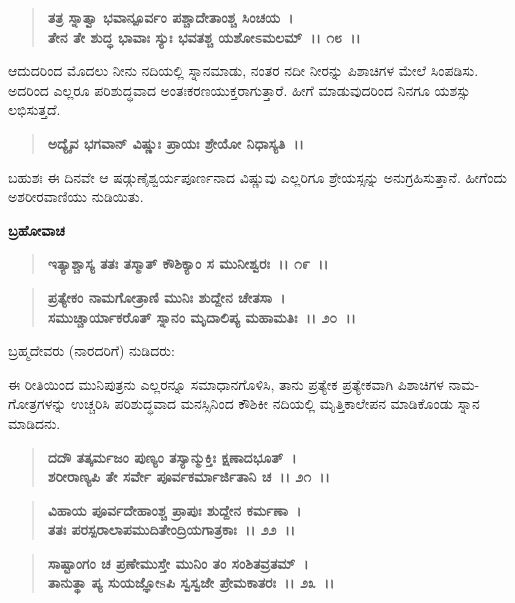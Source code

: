 \begin{verse}
\textbf{ತತ್ರ ಸ್ನಾತ್ವಾ ಭವಾನ್ಪೂರ್ವಂ ಪಶ್ಚಾದೇತಾಂಶ್ಚ ಸಿಂಚಯ~।}\\\textbf{ತೇನ ತೇ ಶುದ್ಧ ಭಾವಾಃ ಸ್ಯುಃ ಭವತಶ್ಚ ಯಶೋಽಮಲಮ್~।। ೧೮~।।}
\end{verse}

ಆದುದರಿಂದ ಮೊದಲು ನೀನು ನದಿಯಲ್ಲಿ ಸ್ನಾನಮಾಡು, ನಂತರ ನದೀ ನೀರನ್ನು ಪಿಶಾಚಿಗಳ ಮೇಲೆ ಸಿಂಪಡಿಸು. ಅದರಿಂದ ಎಲ್ಲರೂ ಪರಿಶುದ್ಧವಾದ ಅಂತಃಕರಣಯುಕ್ತ\-ರಾಗುತ್ತಾರೆ. ಹೀಗೆ ಮಾಡುವುದರಿಂದ ನಿನಗೂ ಯಶಸ್ಸು ಲಭಿಸುತ್ತದೆ.

\begin{verse}
\textbf{ಅದ್ಯೈವ ಭಗವಾನ್ ವಿಷ್ಣುಃ ಪ್ರಾಯಃ ಶ್ರೇಯೋ ನಿಧಾಸ್ಯತಿ~।।}
\end{verse}

ಬಹುಶಃ ಈ ದಿನವೇ ಆ ಷಡ್ಗುಣೈಶ್ವರ್ಯಪೂರ್ಣನಾದ ವಿಷ್ಣುವು ಎಲ್ಲರಿಗೂ ಶ್ರೇಯಸ್ಸನ್ನು ಅನುಗ್ರಹಿಸುತ್ತಾನೆ. ಹೀಗೆಂದು ಅಶರೀರವಾಣಿಯು ನುಡಿಯಿತು.

\begin{flushleft}
\textbf{ಬ್ರಹೋವಾಚ\enginline{-}}
\end{flushleft}

\begin{verse}
\textbf{ಇತ್ಯಾಶ್ಚಾಸ್ಯ ತತಃ ತಸ್ಮಾತ್ ಕೌಶಿಕ್ಯಾಂ ಸ ಮುನೀಶ್ವರಃ~।। ೧೯~।।} 
\end{verse}

\begin{verse}
\textbf{ಪ್ರತ್ಯೇಕಂ ನಾಮಗೋತ್ರಾಣಿ ಮುನಿಃ ಶುದ್ದೇನ ಚೇತಸಾ~।}\\\textbf{ಸಮುಚ್ಚಾರ್ಯಾಕರೊತ್ ಸ್ನಾನಂ ಮೃದಾಲಿಪ್ಯ ಮಹಾಮತಿಃ~।। ೨೦~।।}
\end{verse}

ಬ್ರಹ್ಮದೇವರು (ನಾರದರಿಗೆ) ನುಡಿದರು:

ಈ ರೀತಿಯಿಂದ ಮುನಿಪುತ್ರನು ಎಲ್ಲರನ್ನೂ ಸಮಾಧಾನಗೊಳಿಸಿ, ತಾನು ಪ್ರತ್ಯೇಕ ಪ್ರತ್ಯೇಕವಾಗಿ ಪಿಶಾಚಿಗಳ ನಾಮ-ಗೋತ್ರಗಳನ್ನು ಉಚ್ಚರಿಸಿ ಪರಿಶುದ್ಧವಾದ ಮನಸ್ಸಿನಿಂದ ಕೌಶಿಕೀ ನದಿಯಲ್ಲಿ ಮೃತ್ತಿಕಾಲೇಪನ ಮಾಡಿಕೊಂಡು ಸ್ನಾನ ಮಾಡಿದನು.

\begin{verse}
\textbf{ದದೌ ತತ್ಕರ್ಮಜಂ ಪುಣ್ಯಂ ತಸ್ಯಾನ್ಮುಕ್ತಿಃ ಕ್ಷಣಾದಭೂತ್~।}\\\textbf{ಶರೀರಾಣ್ಯಪಿ ತೇ ಸರ್ವೇ ಪೂರ್ವಕರ್ಮಾರ್ಜಿತಾನಿ ಚ~।। ೨೧~।। }
\end{verse}

\begin{verse}
\textbf{ವಿಹಾಯ ಪೂರ್ವದೇಹಾಂಶ್ಚ ಪ್ರಾಪುಃ ಶುದ್ದೇನ ಕರ್ಮಣಾ~।}\\\textbf{ತತಃ ಪರಸ್ಪರಾಲಾಪಮುದಿತೇಂದ್ರಿಯಗಾತ್ರಕಾಃ~।। ೨೨~।। }
\end{verse}

\begin{verse}
\textbf{ಸಾಷ್ಟಾಂಗಂ ಚ ಪ್ರಣೇಮುಸ್ತೇ ಮುನಿಂ ತಂ ಸಂಶಿತವ್ರತಮ್~।}\\\textbf{ತಾನುತ್ಥಾ ಪ್ಯ ಸುಯಜ್ಞೋsಪಿ ಸ್ವಸ್ವಜೇ ಪ್ರೇಮಕಾತರಃ~।। ೨೩~।।}
\end{verse}

